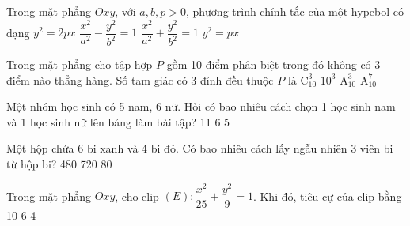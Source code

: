 \begin{ex}%
Trong mặt phẳng $Oxy$, với $a, b, p>0$, phương trình chính tắc của một hypebol có dạng
\choice
{$y^2=2 p x$}
{\True $\dfrac{x^2}{a^2}-\dfrac{y^2}{b^2}=1$}
{$\dfrac{x^2}{a^2}+\dfrac{y^2}{b^2}=1$}
{$y^2=p x$}
\end{ex}
\begin{ex}%
Trong mặt phẳng cho tập hợp $P$ gồm 10 điểm phân biệt trong đó không có 3 điểm nào thẳng hàng. Số tam giác có 3 đỉnh đều thuộc $P$ là
\choice
{\True $\mathrm{C}_{10}^3$}
{$10^3$}
{$\mathrm{A}_{10}^3$}
{$\mathrm{A}_{10}^7$}
\end{ex}
\begin{ex}%
Một nhóm học sinh có 5 nam, 6 nữ. Hỏi có bao nhiêu cách chọn 1 học sinh nam và 1 học sinh nữ lên bảng làm bài tập?
\choice
{11}
{}
{6}
{5}
\end{ex}
\begin{ex}%
Một hộp chứa 6 bi xanh và 4 bi đỏ. Có bao nhiêu cách lấy ngẫu nhiên 3 viên bi từ hộp bi?
\choice
{480}
{}
{720}
{80}
\end{ex}
\begin{ex}%
Trong mặt phẳng $Oxy$, cho elip $(E)\colon \dfrac{x^2}{25}+\dfrac{y^2}{9}=1$. Khi đó, tiêu cự của elip bằng
\choice
{10}
{6}
{}
{4}
\end{ex}
